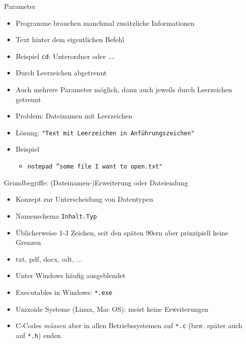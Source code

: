 \begin{frame}{Parameter}
%
\begin{itemize}
\item Programme brauchen manchmal zusätzliche Informationen
\item Text hinter dem eigentlichen Befehl
\item Beispiel \texttt{cd}: Unterordner oder \texttt{..}
\item Durch Leerzeichen abgetrennt
\item Auch mehrere Parameter möglich, dann auch jeweils durch Leerzeichen getrennt
\item Problem: Dateinamen mit Leerzeichen
\item Lösung: \texttt{"Text mit Leerzeichen in Anführungszeichen"}
\item Beispiel
	\begin{itemize}
	\item \texttt{notepad ''some file I want to open.txt"}
	\end{itemize}
\end{itemize}
%
\end{frame}


\begin{frame}{Grundbegriffe: (Dateinamen-)Erweiterung oder Dateiendung}
%
\begin{itemize}
\item Konzept zur Unterscheidung von Datentypen
\item Namenschema \texttt{Inhalt.Typ}
\item Üblicherweise 1-3 Zeichen, seit den späten 90ern aber prinzipiell keine Grenzen
\item txt, pdf, docx, odt, ...
\item Unter Windows häufig ausgeblendet
\item Executables in Windows: \texttt{*.exe}
\item Unixoide Systeme (Linux, Mac OS): meist keine Erweiterungen
\item C-Codes \emph{müssen} aber in allen Betriebssystemen auf \texttt{*.c} (bzw. später auch auf \texttt{*.h}) enden
\end{itemize}
%
\end{frame}


